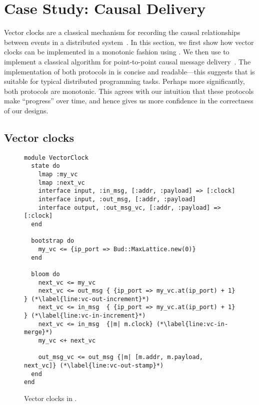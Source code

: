 \section{Case Study: Causal Delivery}
\label{sec:causal}

Vector clocks are a classical mechanism for recording the causal relationships
between events in a distributed system~\cite{Fidge1988,Mattern1989}. In this
section, we first show how vector clocks can be implemented in a monotonic
fashion using \lang. We then use \lang to implement a classical algorithm for
point-to-point causal message delivery~\cite{Schiper1989}. The implementation of
both protocols in \lang is concise and readable---this suggests that \lang is
suitable for typical distributed programming tasks. Perhaps more significantly,
both protocols are monotonic. This agrees with our intuition that these
protocols make ``progress'' over time, and hence gives us more confidence in the
correctness of our designs.


\subsection{Vector clocks}
\begin{figure}[t]
\begin{scriptsize}
\begin{lstlisting}
module VectorClock
  state do
    lmap :my_vc
    lmap :next_vc
    interface input, :in_msg, [:addr, :payload] => [:clock]
    interface input, :out_msg, [:addr, :payload]
    interface output, :out_msg_vc, [:addr, :payload] => [:clock]
  end

  bootstrap do
    my_vc <= {ip_port => Bud::MaxLattice.new(0)}
  end

  bloom do
    next_vc <= my_vc
    next_vc <= out_msg { {ip_port => my_vc.at(ip_port) + 1} } (*\label{line:vc-out-increment}*)
    next_vc <= in_msg  { {ip_port => my_vc.at(ip_port) + 1} } (*\label{line:vc-in-increment}*)
    next_vc <= in_msg  {|m| m.clock} (*\label{line:vc-in-merge}*)
    my_vc <+ next_vc

    out_msg_vc <= out_msg {|m| [m.addr, m.payload, next_vc]} (*\label{line:vc-out-stamp}*)
  end
end
\end{lstlisting}
\end{scriptsize}
\caption{Vector clocks in \lang.}
\label{fig:vector-clock-src}
\end{figure}

